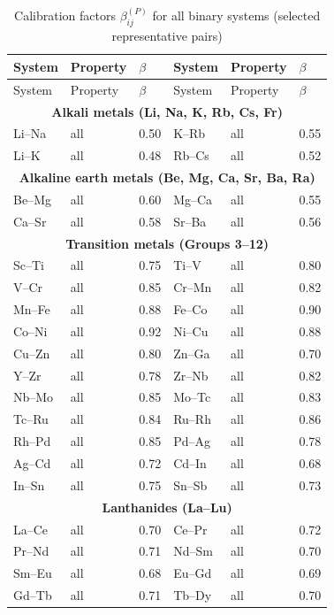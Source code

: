 \documentclass[12pt,a4paper]{article}
\begin{document}
	\begin{longtable}{p{1.5cm}p{1.5cm}p{1.2cm}p{1.2cm}p{1.2cm}p{1.2cm}}
		\caption{Calibration factors \(\beta_{ij}^{(P)}\) for all binary systems (selected representative pairs)} \label{tab:beta-full} \\
		\toprule
		System & Property & \(\beta\) & System & Property & \(\beta\) \\
		\midrule
		\endfirsthead
		\toprule
		System & Property & \(\beta\) & System & Property & \(\beta\) \\
		\midrule
		\endhead
		\multicolumn{6}{c}{\textbf{Alkali metals (Li, Na, K, Rb, Cs, Fr)}} \\
		Li–Na & all & 0.50 & K–Rb & all & 0.55 \\
		Li–K  & all & 0.48 & Rb–Cs & all & 0.52 \\
		\multicolumn{6}{c}{\textbf{Alkaline earth metals (Be, Mg, Ca, Sr, Ba, Ra)}} \\
		Be–Mg & all & 0.60 & Mg–Ca & all & 0.55 \\
		Ca–Sr & all & 0.58 & Sr–Ba & all & 0.56 \\
		\multicolumn{6}{c}{\textbf{Transition metals (Groups 3–12)}} \\
		Sc–Ti & all & 0.75 & Ti–V & all & 0.80 \\
		V–Cr  & all & 0.85 & Cr–Mn & all & 0.82 \\
		Mn–Fe & all & 0.88 & Fe–Co & all & 0.90 \\
		Co–Ni & all & 0.92 & Ni–Cu & all & 0.88 \\
		Cu–Zn & all & 0.80 & Zn–Ga & all & 0.70 \\
		Y–Zr  & all & 0.78 & Zr–Nb & all & 0.82 \\
		Nb–Mo & all & 0.85 & Mo–Tc & all & 0.83 \\
		Tc–Ru & all & 0.84 & Ru–Rh & all & 0.86 \\
		Rh–Pd & all & 0.85 & Pd–Ag & all & 0.78 \\
		Ag–Cd & all & 0.72 & Cd–In & all & 0.68 \\
		In–Sn & all & 0.75 & Sn–Sb & all & 0.73 \\
		\multicolumn{6}{c}{\textbf{Lanthanides (La–Lu)}} \\
		La–Ce & all & 0.70 & Ce–Pr & all & 0.72 \\
		Pr–Nd & all & 0.71 & Nd–Sm & all & 0.70 \\
		Sm–Eu & all & 0.68 & Eu–Gd & all & 0.69 \\
		Gd–Tb & all & 0.71 & Tb–Dy & all & 0.70 \\

\end{longtable}
\end{document}
